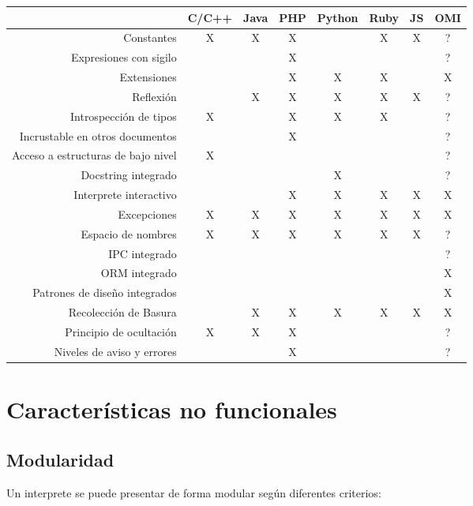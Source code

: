 \FloatBarrier
\begin{table}[h]
\begin{center}
 
\begin{tabular}{|r|c|c|c|c|c|c|c|} \hline
 & C/C++ & Java & PHP  & Python & Ruby & JS & OMI\\ \hline
Constantes & X & X & X & & X & X & ? \\ \hline
Expresiones con sigilo & & & X & & & & ? \\ \hline
Extensiones & & & X & X & X &   & X \\ \hline
Reflexión & & X & X & X & X & X & ? \\ \hline
Introspección de tipos & X & & X & X & X & & ? \\ \hline
Incrustable en otros documentos & & & X &  & & & ? \\ \hline
Acceso a estructuras de bajo nivel & X &  &  &  &  &  & ? \\ \hline
Docstring integrado & & &  & X &   &  & ? \\ \hline
Interprete interactivo & & & X & X & X & X & X \\ \hline
Excepciones  & X & X & X & X & X & X & X \\ \hline
Espacio de nombres & X & X & X & X & X & X & ? \\ \hline
IPC integrado & & &  &  &  &  & ? \\ \hline
ORM integrado & & & & & & & X \\ \hline
Patrones de diseño integrados & & & & & & & X \\ \hline
Recolección de Basura & & X & X & X & X & X & X \\ \hline 
Principio de ocultación &X & X & X & & & & ? \\ \hline
Niveles de aviso y errores & & & X & & & & ? \\ \hline
\end{tabular}
\end{center}
\end{table}
\FloatBarrier

\section {Características no funcionales}
\subsection{Modularidad}
Un interprete se puede presentar de forma modular según diferentes criterios:

